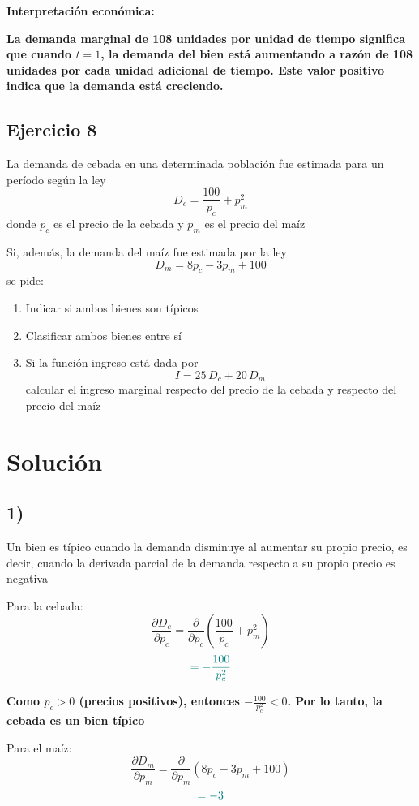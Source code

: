 \documentclass{article}
\begin{document}
\textbf{\color{teal}Interpretación económica:}

\textbf{\color{teal}La demanda marginal de 108 unidades por unidad de tiempo significa que cuando \(t = 1\), la demanda del bien está aumentando a razón de 108 unidades por cada unidad adicional de tiempo. Este valor positivo indica que la demanda está creciendo.}


\newpage
\subsection{Ejercicio 8}

La demanda de cebada en una determinada población fue estimada para un período según la ley
\[
D_c = \frac{100}{p_c} + p_m^2
\]
donde \(p_c\) es el precio de la cebada y \(p_m\) es el precio del maíz

Si, además, la demanda del maíz fue estimada por la ley
\[
D_m = 8p_c - 3p_m + 100
\]
se pide:

\begin{enumerate}
  \item Indicar si ambos bienes son típicos
  \item Clasificar ambos bienes entre sí
  \item Si la función ingreso está dada por 
  \[
  I = 25\,D_c + 20\,D_m
  \]
  calcular el ingreso marginal respecto del precio de la cebada y respecto del precio del maíz
\end{enumerate}

\newpage
\section*{Solución}

\subsection*{1)}

Un bien es típico cuando la demanda disminuye al aumentar su propio precio, es decir, cuando la derivada parcial de la demanda respecto a su propio precio es negativa

Para la cebada:
\[
\frac{\partial D_c}{\partial p_c} = \frac{\partial}{\partial p_c}\left(\frac{100}{p_c} + p_m^2\right)
\]
\[
\color{teal}
= -\frac{100}{p_c^2}
\]

\textbf{\color{teal}Como \(p_c > 0\) (precios positivos), entonces \(-\frac{100}{p_c^2} < 0\). Por lo tanto, la cebada es un bien típico}

Para el maíz:
\[
\frac{\partial D_m}{\partial p_m} = \frac{\partial}{\partial p_m}(8p_c - 3p_m + 100)
\]
\[
\color{teal}
= -3
\]
\end{document}
